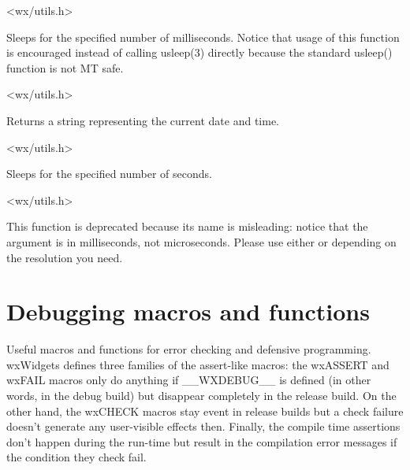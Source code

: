
<wx/utils.h>


\label{wxmillisleep}


Sleeps for the specified number of milliseconds. Notice that usage of this
function is encouraged instead of calling usleep(3) directly because the
standard usleep() function is not MT safe.


<wx/utils.h>


\label{wxnow}


Returns a string representing the current date and time.


<wx/utils.h>


\label{wxsleep}


Sleeps for the specified number of seconds.


<wx/utils.h>


\label{wxusleep}


This function is deprecated because its name is misleading: notice that the
argument is in milliseconds, not microseconds. Please use either
 or 
depending on the resolution you need.



\section{Debugging macros and functions}\label{debugmacros}

Useful macros and functions for error checking and defensive programming.
wxWidgets defines three families of the assert-like macros:
the wxASSERT and wxFAIL macros only do anything if \_\_WXDEBUG\_\_ is defined
(in other words, in the debug build) but disappear completely in the release
build. On the other hand, the wxCHECK macros stay event in release builds but a
check failure doesn't generate any user-visible effects then. Finally, the
compile time assertions don't happen during the run-time but result in the
compilation error messages if the condition they check fail.

